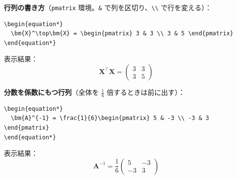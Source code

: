 \documentclass[a4paper,dvipdfmx]{jsarticle}
\newcommand{\提出期限}{2026年10月19日（月）}
\newcommand{\学籍番号}{0000000}
\newcommand{\氏名}{氏名を書く}
\newcommand{\提出日}{2026年10月19日}
\begin{document}
\noindent
\textbf{行列の書き方}（\verb|pmatrix| 環境。\verb|&| で列を区切り、\verb|\\| で行を変える）：
\begin{verbatim}
\begin{equation*}
  \bm{X}^\top\bm{X} = \begin{pmatrix} 3 & 3 \\ 3 & 5 \end{pmatrix}
\end{equation*}
\end{verbatim}
表示結果：
\begin{equation*}
  \bm{X}^\top\bm{X} = \begin{pmatrix} 3 & 3 \\ 3 & 5 \end{pmatrix}
\end{equation*}

\noindent
\textbf{分数を係数にもつ行列}（全体を $\frac{1}{6}$ 倍するときは前に出す）：
\begin{verbatim}
\begin{equation*}
  \bm{A}^{-1} = \frac{1}{6}\begin{pmatrix} 5 & -3 \\ -3 & 3 \end{pmatrix}
\end{equation*}
\end{verbatim}
表示結果：
\begin{equation*}
  \bm{A}^{-1} = \frac{1}{6}\begin{pmatrix} 5 & -3 \\ -3 & 3 \end{pmatrix}
\end{equation*}
\end{document}
